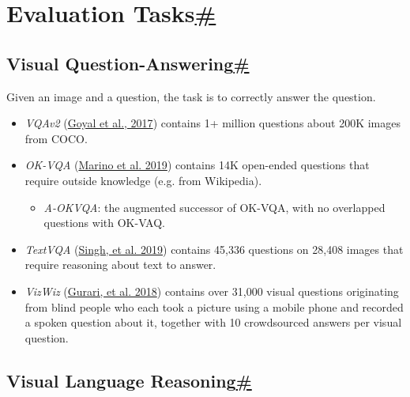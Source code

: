 \section{\texorpdfstring{Evaluation Tasks\hyperref[evaluation-tasks]{\#}}{Evaluation Tasks\#}}\label{evaluation-tasks}

\subsection{\texorpdfstring{Visual Question-Answering\hyperref[visual-question-answering]{\#}}{Visual Question-Answering\#}}\label{visual-question-answering}

Given an image and a question, the task is to correctly answer the question.

\begin{itemize}
\tightlist
\item
  \emph{VQAv2} (\href{https://arxiv.org/abs/1612.00837}{Goyal et al., 2017}) contains 1+ million questions about 200K images from COCO.
\item
  \emph{OK-VQA} (\href{https://arxiv.org/abs/1906.00067}{Marino et al. 2019}) contains 14K open-ended questions that require outside knowledge (e.g. from Wikipedia).

  \begin{itemize}
  \tightlist
  \item
    \emph{A-OKVQA}: the augmented successor of OK-VQA, with no overlapped questions with OK-VAQ.
  \end{itemize}
\item
  \emph{TextVQA} (\href{https://arxiv.org/abs/1904.08920}{Singh, et al. 2019}) contains 45,336 questions on 28,408 images that require reasoning about text to answer.
\item
  \emph{VizWiz} (\href{https://arxiv.org/abs/1802.08218}{Gurari, et al. 2018}) contains over 31,000 visual questions originating from blind people who each took a picture using a mobile phone and recorded a spoken question about it, together with 10 crowdsourced answers per visual question.
\end{itemize}

\subsection{\texorpdfstring{Visual Language Reasoning\hyperref[visual-language-reasoning]{\#}}{Visual Language Reasoning\#}}\label{visual-language-reasoning}

